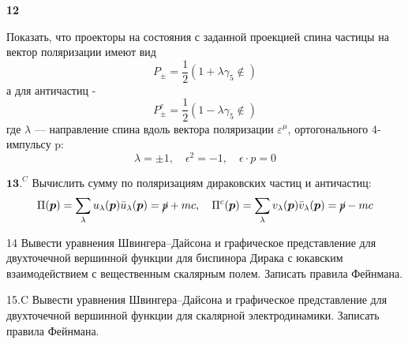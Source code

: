 \documentclass[a4paper,12pt]{article} %
\begin{document}
\begin{ttask} \textbf{12} 

Показать, что проекторы на состояния с заданной проекцией
спина частицы на вектор поляризации имеют вид
$$
P_{\pm}=\frac{1}{2}\left(1+\lambda \gamma_{5} \notin\right)
$$
а для античастиц -
$$
P_{\pm}^{c}=\frac{1}{2}\left(1-\lambda \gamma_{5} \notin\right)
$$
где $\lambda$ — направление спина вдоль вектора поляризации $\varepsilon^\mu$, ортогонального 4-импульсу p:
$$
\lambda=\pm 1, \quad \epsilon^{2}=-1, \quad \epsilon \cdot p=0
$$









\end{ttask}



\begin{ttask}


$\mathbf{1 3 .}^{C}$ Вычислить сумму по поляризациям дираковских частиц и античастиц:
$$
\Pi(\boldsymbol{p})=\sum_{\lambda} u_{\lambda}(\boldsymbol{p}) \bar{u}_{\lambda}(\boldsymbol{p})=\cancel p+m c, \quad \Pi^{c}(\boldsymbol{p})=
\sum_{\lambda} v_{\lambda}(\boldsymbol{p}) \bar{v}_{\lambda}(\boldsymbol{p})=\cancel p-m c
$$









\end{ttask}






\begin{ttask}

14 Вывести уравнения Швингера–Дайсона и графическое представление для двухточечной вершинной функции для биспинора Дирака с юкавским взаимодействием с вещественным скалярным полем. Записать правила Фейнмана.









\end{ttask}



\begin{ttask}

15.C Вывести уравнения Швингера–Дайсона и графическое представление для двухточечной вершинной функции для скалярной электродинамики. Записать правила Фейнмана. 



\end{ttask}
\end{document}

